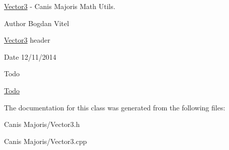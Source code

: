 \hyperlink{class_vector3}{Vector3} -\/ Canis Majoris Math Utils. 

\begin{DoxyAuthor}{Author}
Bogdan Vitel
\end{DoxyAuthor}
\hyperlink{class_vector3}{Vector3} header \begin{DoxyDate}{Date}
12/11/2014 
\end{DoxyDate}
\begin{DoxyRefDesc}{Todo}
\item[\hyperlink{todo__todo000015}{Todo}]\begin{DoxyVerb}\end{DoxyVerb}
\end{DoxyRefDesc}


The documentation for this class was generated from the following files\+:\begin{DoxyCompactItemize}
\item 
Canis Majoris/Vector3.\+h\item 
Canis Majoris/Vector3.\+cpp\end{DoxyCompactItemize}
